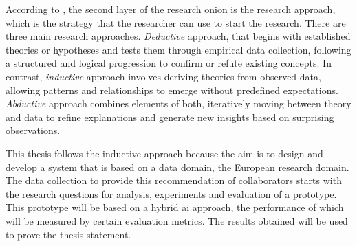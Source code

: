 According to \textcite{SaundersMark2023}, the second layer of the research onion is the research approach, which is the strategy that the researcher can use to start the research.
There are three main research approaches.
\textit{Deductive} approach, that begins with established theories or hypotheses and tests them through empirical data collection, following a structured and logical progression to confirm or refute existing concepts.
In contrast, \textit{inductive} approach involves deriving theories from observed data, allowing patterns and relationships to emerge without predefined expectations.
\textit{Abductive} approach combines elements of both, iteratively moving between theory and data to refine explanations and generate new insights based on surprising observations.

This thesis follows the inductive approach because the aim is to design and develop a system that is based on a data domain, the European research domain.
The data collection to provide this recommendation of collaborators starts with the research questions for analysis, experiments and evaluation of a prototype.
This prototype will be based on a hybrid \gls{ai} approach, the performance of which will be measured by certain evaluation metrics.
The results obtained will be used to prove the thesis statement.